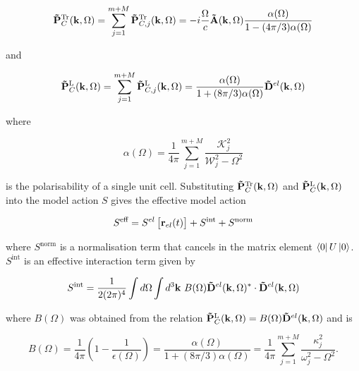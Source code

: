 \begin{equation} \label{eqn:tr_sol}
    \vb{\Tilde{P}}^{\text{Tr}}_{C}(\vb{k}, \Omega) = \sum_{j = 1}^{m+M} \vb{\Tilde{P}}^{\text{Tr}}_{C, j}(\vb{k}, \Omega) = -i \frac{\Omega}{c} \vb{\Tilde{A}}(\vb{k}, \Omega) \frac{\alpha(\Omega)}{1 - (4\pi / 3) \alpha(\Omega)}
\end{equation}

and

\begin{equation}
    \vb{\Tilde{P}}^{\text{L}}_{C}(\vb{k}, \Omega) = \sum_{j = 1}^{m+M} \vb{\Tilde{P}}^{\text{L}}_{C, j}(\vb{k}, \Omega) = \frac{\alpha(\Omega)}{1 + (8\pi / 3) \alpha(\Omega)} \vb{\Tilde{D}}^{el}(\vb{k}, \Omega)
\end{equation}

where

\begin{equation}
    \alpha(\Omega) = \frac{1}{4\pi} \sum_{j=1}^{m+M} \frac{\mathcal{K}_j^2}{\mathcal{W}_j^2 - \Omega^2}
\end{equation}

is the polarisability of a single unit cell. Substituting $\vb{\Tilde{P}}^{\text{Tr}}_{C}(\vb{k}, \Omega)$ and $\vb{\Tilde{P}}^{\text{L}}_{C}(\vb{k}, \Omega)$ into the model action $S$ gives the effective model action 

\begin{equation}
    S^{\text{eff}} = S^{el}\left[ \vb{r}_{el}(t) \right] + S^{\text{int}} + S^{\text{norm}}
\end{equation}

where $S^{\text{norm}}$ is a normalisation term that cancels in the matrix element $\bra{0} U \ket{0}$. $S^{\text{int}}$ is an effective interaction term given by

\begin{equation}
    S^{\text{int}} = \frac{1}{2 (2\pi)^4} \int d\Omega \int d^3 \vb{k}\ B(\Omega) \vb{\Tilde{D}}^{el}(\vb{k}, \Omega)^* \cdot \vb{\Tilde{D}}^{el}(\vb{k}, \Omega)
\end{equation}

where $B(\Omega)$ was obtained from the relation $\vb{\Tilde{P}}^{\text{L}}_{C}(\vb{k}, \Omega) = B(\Omega) \vb{\Tilde{D}}^{el}(\vb{k}, \Omega)$ and is

\begin{equation}
    B(\Omega) = \frac{1}{4\pi} \left( 1 - \frac{1}{\epsilon(\Omega)} \right) = \frac{\alpha(\Omega)}{1+(8\pi/3)\alpha(\Omega)} = \frac{1}{4\pi} \sum_{j = 1}^{m + M} \frac{\kappa_j^2}{\omega_j^2 - \Omega^2}.
\end{equation}

